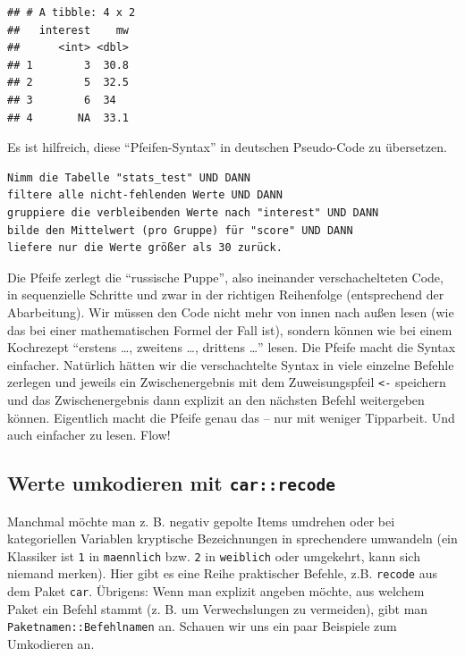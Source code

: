 \documentclass[12pt,ngerman,paper=a4,pagesize,DIV=13]{scrreprt}
\begin{document}
\begin{verbatim}
## # A tibble: 4 x 2
##   interest    mw
##      <int> <dbl>
## 1        3  30.8
## 2        5  32.5
## 3        6  34  
## 4       NA  33.1
\end{verbatim}

Es ist hilfreich, diese \enquote{Pfeifen-Syntax} in deutschen
Pseudo-Code zu übersetzen.

\begin{verbatim}
Nimm die Tabelle "stats_test" UND DANN  
filtere alle nicht-fehlenden Werte UND DANN  
gruppiere die verbleibenden Werte nach "interest" UND DANN  
bilde den Mittelwert (pro Gruppe) für "score" UND DANN  
liefere nur die Werte größer als 30 zurück.  
\end{verbatim}

Die Pfeife zerlegt die \enquote{russische Puppe}, also ineinander
verschachelteten Code, in sequenzielle Schritte und zwar in der
richtigen Reihenfolge (entsprechend der Abarbeitung). Wir müssen den
Code nicht mehr von innen nach außen lesen (wie das bei einer
mathematischen Formel der Fall ist), sondern können wie bei einem
Kochrezept \enquote{erstens \dots, zweitens \dots, drittens \dots}
lesen. Die Pfeife macht die Syntax einfacher. Natürlich hätten wir die
verschachtelte Syntax in viele einzelne Befehle zerlegen und jeweils ein
Zwischenergebnis mit dem Zuweisungspfeil \texttt{\textless{}-} speichern
und das Zwischenergebnis dann explizit an den nächsten Befehl
weitergeben können. Eigentlich macht die Pfeife genau das -- nur mit
weniger Tipparbeit. Und auch einfacher zu lesen. Flow!

\hypertarget{werte-umkodieren-mit-carrecode}{%
\subsection{\texorpdfstring{Werte umkodieren mit
\texttt{car::recode}}{Werte umkodieren mit car::recode}}\label{werte-umkodieren-mit-carrecode}}

Manchmal möchte man z. B. negativ gepolte Items umdrehen oder bei
kategoriellen Variablen kryptische Bezeichnungen in sprechendere
umwandeln (ein Klassiker ist \texttt{1} in \texttt{maennlich} bzw.
\texttt{2} in \texttt{weiblich} oder umgekehrt, kann sich niemand
merken). Hier gibt es eine Reihe praktischer Befehle, z.B.
\texttt{recode} aus dem Paket \texttt{car}. Übrigens: Wenn man explizit
angeben möchte, aus welchem Paket ein Befehl stammt (z. B. um
Verwechslungen zu vermeiden), gibt man \texttt{Paketnamen::Befehlnamen}
an. Schauen wir uns ein paar Beispiele zum Umkodieren an.
\end{document}
